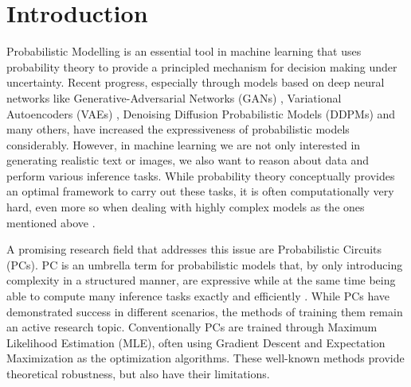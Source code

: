 \chapter{Introduction}
\label{cha:introduction}


Probabilistic Modelling is an essential tool in machine learning that uses probability theory to provide a 
principled mechanism for decision making under uncertainty. Recent progress, especially through models based on deep neural networks like Generative-Adversarial
Networks (GANs) \cite{gan}, Variational Autoencoders (VAEs) \cite{vae}, Denoising Diffusion Probabilistic Models (DDPMs) \cite{ddpm} and many others, have increased the expressiveness of probabilistic models considerably. 
However, in machine learning we are not only interested in generating realistic text or images, 
we also want to reason about data and perform various inference tasks. While probability theory conceptually provides 
an optimal framework to carry out these tasks, it is often computationally very hard, even more so when dealing 
with highly complex models as the ones mentioned above \cite{pc_intro}.

A promising research field that addresses this issue are Probabilistic Circuits (PCs). PC is an umbrella term for probabilistic models that, by only introducing 
complexity in a structured manner, are expressive while at the same time 
being able to compute many inference tasks exactly and efficiently \cite{pc_intro}. While PCs have demonstrated success in different scenarios, the methods of training them remain 
an active research topic. Conventionally PCs are trained through Maximum Likelihood Estimation (MLE), often 
using Gradient Descent and Expectation Maximization as the optimization algorithms. These well-known methods
provide theoretical robustness, but also have their limitations.
